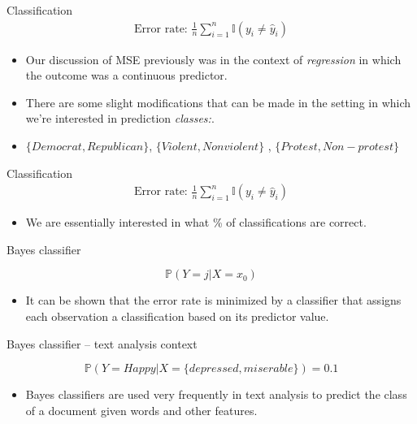 \documentclass{beamer}
\begin{document}
\begin{frame}{Classification}
\begin{align*}
	\text{Error rate: } \frac{1}{n} \sum_{i=1}^{n} \mathbb{I}(y_{i} \neq \hat{y}_{i})
\end{align*}
	\begin{itemize}
		\item Our discussion of MSE previously was in the context of \textit{regression} in which the outcome was a continuous predictor.
		\item There are some slight modifications  that can be made in the setting in which we're interested in prediction \textit{classes:}.
		\item $\{Democrat,Republican\}$, $\{Violent, Nonviolent\}$ , $\{Protest,Non-protest\}$
	\end{itemize}
\end{frame}

\begin{frame}{Classification}
\begin{align*}
	\text{Error rate: } \frac{1}{n} \sum_{i=1}^{n} \mathbb{I}(y_{i} \neq \hat{y}_{i})
\end{align*}
	\begin{itemize}
		\item We are essentially interested in what \% of classifications are correct.
	\end{itemize}
\end{frame}

\begin{frame}{Bayes classifier}

\begin{equation}
 \mathbb{P}(Y = j | X = x_{0})
\end{equation}

	\begin{itemize}
		\item It can be shown that the error rate is minimized by a classifier that assigns each observation a classification based on its predictor value.
	\end{itemize}
\end{frame}

\begin{frame}{Bayes classifier -- text analysis context}

\begin{equation}
 \mathbb{P}(Y = Happy | X = \{depressed, miserable\}) = 0.1
\end{equation}

	\begin{itemize}
		\item Bayes classifiers are used very frequently in text analysis to predict the class of a document given words and other features.
	\end{itemize}
\end{frame}
\end{document}
